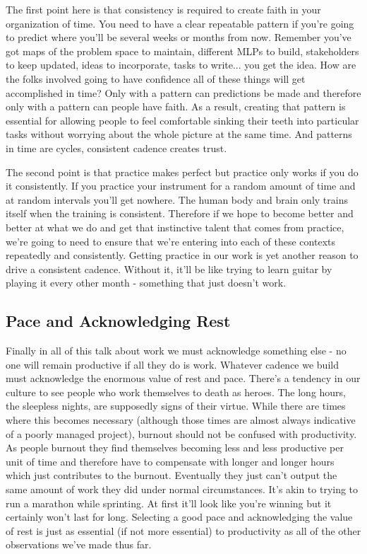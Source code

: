 \documentclass[10pt,a5paper]{book}
\begin{document}
The first point here is that consistency is required to create faith in your organization of time. You need to have a clear repeatable pattern if you're going to predict where you'll be several weeks or months from now. Remember you've got maps of the problem space to maintain, different MLPs to build, stakeholders to keep updated, ideas to incorporate, tasks to write... you get the idea. How are the folks involved going to have confidence all of these things will get accomplished in time? Only with a pattern can predictions be made and therefore only with a pattern can people have faith. As a result, creating that pattern is essential for allowing people to feel comfortable sinking their teeth into particular tasks without worrying about the whole picture at the same time. And patterns in time are cycles, consistent cadence creates trust.

The second point is that practice makes perfect but practice only works if you do it consistently. If you practice your instrument for a random amount of time and at random intervals you'll get nowhere. The human body and brain only trains itself when the training is consistent. Therefore if we hope to become better and better at what we do and get that instinctive talent that comes from practice, we're going to need to ensure that we're entering into each of these contexts repeatedly and consistently. Getting practice in our work is yet another reason to drive a consistent cadence. Without it, it'll be like trying to learn guitar by playing it every other month - something that just doesn't work.

\subsection{Pace and Acknowledging Rest}
Finally in all of this talk about work we must acknowledge something else - no one will remain productive if all they do is work. Whatever cadence we build must acknowledge the enormous value of rest and pace. There's a tendency in our culture to see people who work themselves to death as heroes. The long hours, the sleepless nights, are supposedly signs of their virtue. While there are times where this becomes necessary (although those times are almost always indicative of a poorly managed project), burnout should not be confused with productivity. As people burnout they find themselves becoming less and less productive per unit of time and therefore have to compensate with longer and longer hours which just contributes to the burnout. Eventually they just can't output the same amount of work they did under normal circumstances. It's akin to trying to run a marathon while sprinting. At first it'll look like you're winning but it certainly won't last for long. Selecting a good pace and acknowledging the value of rest is just as essential (if not more essential) to productivity as all of the other observations we've made thus far. 
\end{document}
